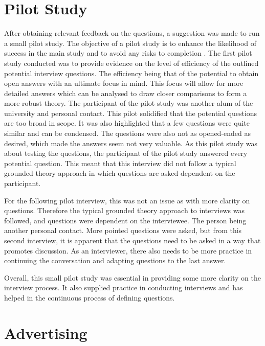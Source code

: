 \section{Pilot Study}

\par After obtaining relevant feedback on the questions, a suggestion was made to run a small pilot study.  The objective of a pilot study is to enhance the likelihood of success in the main study and to avoid any risks to completion \cite{pilot}. The first pilot study conducted was to provide evidence on the level of efficiency of the outlined potential interview questions. The efficiency being that of the potential to obtain open answers with an ultimate focus in mind. This focus will allow for more detailed answers which can be analysed to draw closer comparisons to form a more robust theory. The participant of the pilot study was another alum of the university and personal contact. This pilot solidified that the potential questions are too broad in scope. It was also highlighted that a few questions were quite similar and can be condensed. The questions were also not as opened-ended as desired, which made the answers seem not very valuable. As this pilot study was about testing the questions, the participant of the pilot study answered every potential question. This meant that this interview did not follow a typical grounded theory approach in which questions are asked dependent on the participant. 
\newline
\par For the following pilot interview, this was not an issue as with more clarity on questions. Therefore the typical grounded theory approach to interviews was followed, and questions were dependent on the interviewee. The person being another personal contact. More pointed questions were asked, but from this second interview, it is apparent that the questions need to be asked in a way that promotes discussion. As an interviewer, there also needs to be more practice in continuing the conversation and adapting questions to the last answer. 
\newline
\par Overall, this small pilot study was essential in providing some more clarity on the interview process. It also supplied practice in conducting interviews and has helped in the continuous process of defining questions. 

\section{Advertising}

